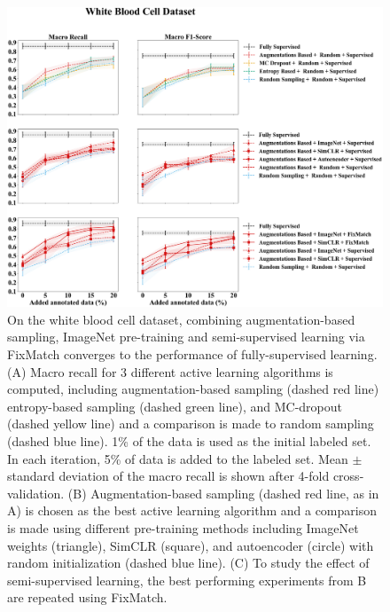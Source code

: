\begin{figure}[htbp]
\centering
\captionsetup{format=plain}
\includegraphics[width=\textwidth]{figures/fig_2_white_recall_f1.png}
\caption{On the white blood cell dataset, combining augmentation-based sampling, ImageNet pre-training and semi-supervised learning via FixMatch converges to the performance of fully-supervised learning. (A) Macro recall for 3 different active learning algorithms is computed, including augmentation-based sampling (dashed red line) entropy-based sampling (dashed green line), and MC-dropout (dashed yellow line) and a comparison is made to random sampling (dashed blue line). 1\% of the data is used as the initial labeled set. In each iteration, 5\% of data is added to the labeled set. Mean $\pm$ standard deviation of the macro recall is shown after 4-fold cross-validation. (B) Augmentation-based sampling (dashed red line, as in A) is chosen as the best active learning algorithm and a comparison is made using different pre-training methods including ImageNet weights (triangle), SimCLR (square), and autoencoder (circle) with random initialization (dashed blue line). (C) To study the effect of semi-supervised learning, the best performing experiments from B are repeated using FixMatch.}
\label{fig:fig_2_white_recall_f1}
\end{figure}

